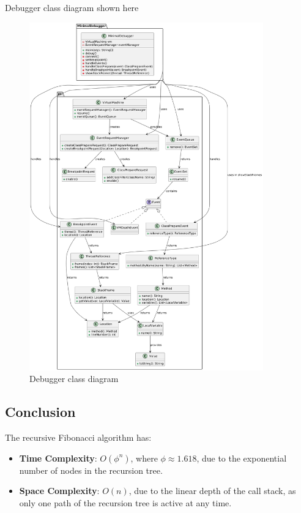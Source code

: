 \documentclass{article}
\begin{document}
Debugger class diagram shown here

\begin{figure}[H]
	\centering
	\includegraphics[width=0.9\textwidth]{./fibonacci-debugger/diagrams/class/DebuggerClass.png}
	\caption{Debugger class diagram}
	\label{fig:debugger_class_diagram}
\end{figure}


\subsection{Conclusion}
The recursive Fibonacci algorithm has:
\begin{itemize}
	\item \textbf{Time Complexity}: \( O(\phi^n) \), where \( \phi \approx 1.618 \), due to the exponential number of nodes in the recursion tree.
	\item \textbf{Space Complexity}: \( O(n) \), due to the linear depth of the call stack, as only one path of the recursion tree is active at any time.
\end{itemize}
\end{document}
